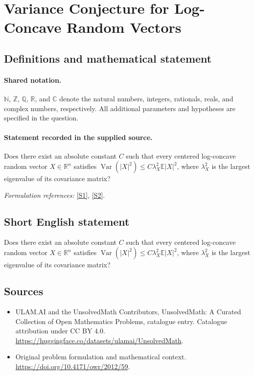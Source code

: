\documentclass[11pt]{article}
\newcommand{\sref}[2]{\hyperlink{source:#1:#2}{[S#2]}}
\begin{document}
\section{Variance Conjecture for Log-Concave Random Vectors}\label{statement}

\subsection{Definitions and mathematical statement}

\paragraph{Shared notation.}$\mathbb N$, $\mathbb Z$, $\mathbb Q$, $\mathbb R$, and $\mathbb C$ denote the natural numbers, integers, rationals, reals, and complex numbers, respectively. All additional parameters and hypotheses are specified in the question.


\paragraph{Statement recorded in the supplied source.}
Does there exist an absolute constant $C$ such that every centered log-concave random vector $X\in\mathbb R^n$ satisfies $\operatorname{Var}(|X|^2)\leq C\lambda_X^2\mathbb E|X|^2$, where $\lambda_X^2$ is the largest eigenvalue of its covariance matrix?
\par\smallskip\textit{Formulation references:} \sref{statement}{1}, \sref{statement}{2}.
\subsection{Short English statement}
Does there exist an absolute constant $C$ such that every centered log-concave random vector $X\in\mathbb R^n$ satisfies $\operatorname{Var}(|X|^2)\leq C\lambda_X^2\mathbb E|X|^2$, where $\lambda_X^2$ is the largest eigenvalue of its covariance matrix?
\subsection{Sources}
\begin{itemize}
\item[\hypertarget{source:statement:1}{S1}] ULAM.AI and the UnsolvedMath Contributors, UnsolvedMath: A Curated Collection of Open Mathematics Problems, catalogue entry. Catalogue attribution under CC BY 4.0.
\url{https://huggingface.co/datasets/ulamai/UnsolvedMath}.
\item[\hypertarget{source:statement:2}{S2}] Original problem formulation and mathematical context.
\url{https://doi.org/10.4171/owr/2012/59}.
\end{itemize}
\label{end:statement}
\end{document}
